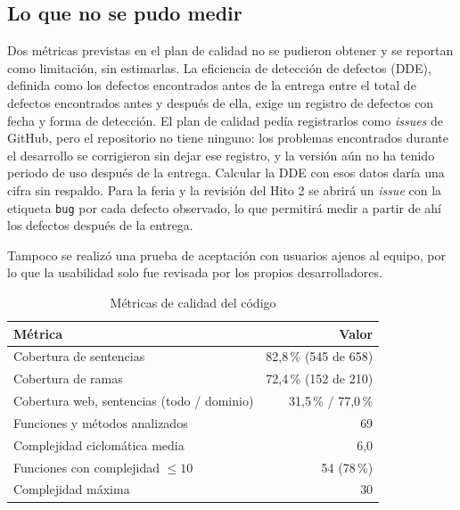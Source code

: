 \documentclass[conference]{IEEEtran}
\begin{document}
\subsection{Lo que no se pudo medir}
Dos métricas previstas en el plan de calidad no se pudieron obtener y se reportan como limitación, sin estimarlas. La eficiencia de detección de defectos (DDE), definida como los defectos encontrados antes de la entrega entre el total de defectos encontrados antes y después de ella, exige un registro de defectos con fecha y forma de detección. El plan de calidad pedía registrarlos como \textit{issues} de GitHub, pero el repositorio no tiene ninguno: los problemas encontrados durante el desarrollo se corrigieron sin dejar ese registro, y la versión aún no ha tenido periodo de uso después de la entrega. Calcular la DDE con esos datos daría una cifra sin respaldo. Para la feria y la revisión del Hito 2 se abrirá un \textit{issue} con la etiqueta \texttt{bug} por cada defecto observado, lo que permitirá medir a partir de ahí los defectos después de la entrega.

Tampoco se realizó una prueba de aceptación con usuarios ajenos al equipo, por lo que la usabilidad solo fue revisada por los propios desarrolladores.

\begin{table}[t]
\caption{Métricas de calidad del código}\label{tab:metricas}
\centering
\begin{tabular}{@{}lr@{}}
\toprule
Métrica & Valor \\
\midrule
Cobertura de sentencias & 82,8\,\% (545 de 658) \\
Cobertura de ramas & 72,4\,\% (152 de 210) \\
Cobertura web, sentencias (todo / dominio) & 31,5\,\% / 77,0\,\% \\
Funciones y métodos analizados & 69 \\
Complejidad ciclomática media & 6,0 \\
Funciones con complejidad $\leq 10$ & 54 (78\,\%) \\
Complejidad máxima & 30 \\
\bottomrule
\end{tabular}
\end{table}
\end{document}

